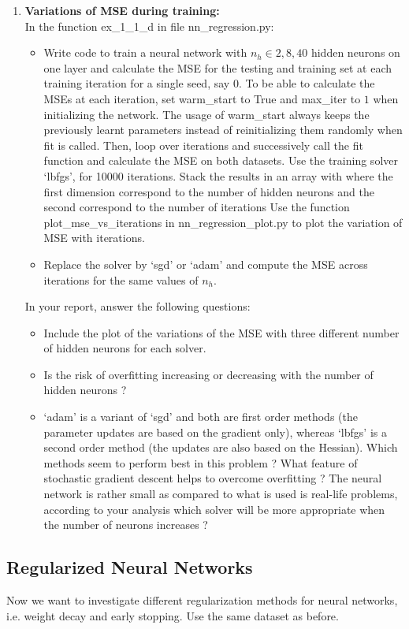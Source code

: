 \documentclass[a4paper]{article}
\begin{document}
\begin{enumerate}[label=(\alph*)]
\item \textbf{Variations of MSE during training:}\\
    In the function ex\_1\_1\_d in file nn\_regression.py:
	\begin{itemize}
        \item Write code to train a neural network with $n_h ∈ 2, 8, 40$ hidden neurons on one layer and calculate the MSE for the testing and training set at each training iteration for a single seed, say $0$. To be able to calculate the MSEs at each iteration, set warm\_start to True and max\_iter to $1$ when initializing the network. The usage of warm\_start always keeps the previously learnt parameters instead of reinitializing them randomly when fit is called. Then, loop over  iterations and successively call the fit function and calculate the MSE on both datasets. Use the training solver ‘lbfgs’, for 10000 iterations. Stack the results in an array with where the first dimension correspond to the number of hidden neurons and the second correspond to the number of iterations Use the function plot\_mse\_vs\_iterations in nn\_regression\_plot.py to plot the variation of MSE with iterations.
        \item Replace the solver by ‘sgd’ or ‘adam’ and compute the MSE across iterations for the same values of $n_h$.
	\end{itemize}
    In your report, answer the following questions:
    \begin{itemize}
        \item Include the plot of the variations of the MSE with three different number of hidden neurons for each solver.
        \item Is the risk of overfitting increasing or decreasing with the number of hidden neurons ? 	\item ‘adam’ is a variant of ‘sgd’ and both are first order methods (the parameter updates are based on the gradient only), whereas ‘lbfgs’ is a second order method (the updates are also based on the Hessian). Which methods seem to perform best in this problem ? What feature of stochastic gradient descent helps to overcome overfitting ? The neural network is rather small as compared to what is used is real-life problems, according to your analysis which solver will be more appropriate when the number of neurons increases ?
    \end{itemize}         
\end{enumerate}

\subsection{Regularized Neural Networks}
Now we want to investigate different regularization methods for neural networks, i.e. weight decay and early stopping. Use the same dataset as before.
\end{document}
